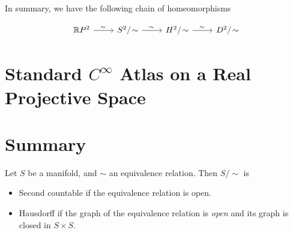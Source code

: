 In summary, we have the following chain of homeomorphisms

\[\begin{tikzcd}
	{\R P^2} & {S^2/\sim} & {H^2/\sim} & {D^2/\sim}
	\arrow["\sim", from=1-1, to=1-2]
	\arrow["\sim", from=1-2, to=1-3]
	\arrow["\sim", from=1-3, to=1-4]
\end{tikzcd}\]



\section{Standard $ C^\infty $ Atlas on a Real Projective Space}



\section{Summary}
\begin{summary}
	Let $ S $ be a manifold, and $ \sim $ an equivalence relation. Then $ S/\sim $ is 
	\begin{itemize}
		\item Second countable if the equivalence relation is open.
		\item Hausdorff if the graph of the equivalence relation is \emph{open} and its graph is closed in $ S\times S $.
	\end{itemize}
\end{summary}

